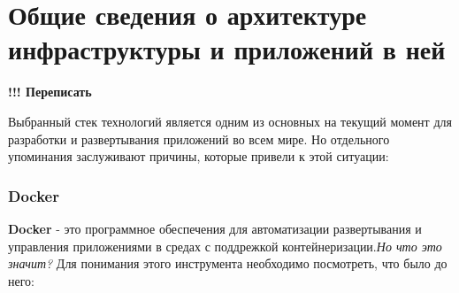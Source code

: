 \section{Общие сведения о архитектуре инфраструктуры и приложений в ней}
\label{sec:history}

\textbf{!!! Переписать}

Выбранный стек технологий является одним из основных на текущий момент для разработки и развертывания приложений во всем мире. Но отдельного упоминания заслуживают причины, которые привели к этой ситуации:

\subsubsection{Docker}

\textbf{Docker} - это программное обеспечения для автоматизации развертывания и управления приложениями в средах с поддрежкой контейнеризации.\textit{Но что это значит?} Для понимания этого инструмента необходимо посмотреть, что было до него:
